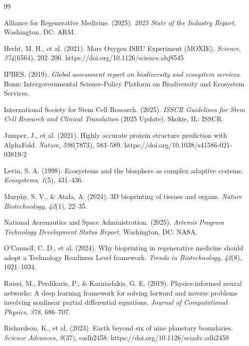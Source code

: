 \documentclass[11pt,a4paper]{article}
\begin{document}
\begin{thebibliography}{99}

Alliance for Regenerative Medicine. (2025). \textit{2025 State of the Industry Report}. Washington, DC: ARM.

Hecht, M. H., et al. (2021). Mars Oxygen ISRU Experiment (MOXIE). \textit{Science}, \textit{374}(6564), 202--206. https://doi.org/10.1126/science.abj8545

IPBES. (2019). \textit{Global assessment report on biodiversity and ecosystem services}. Bonn: Intergovernmental Science-Policy Platform on Biodiversity and Ecosystem Services.

International Society for Stem Cell Research. (2025). \textit{ISSCR Guidelines for Stem Cell Research and Clinical Translation} (2025 Update). Skokie, IL: ISSCR.

Jumper, J., et al. (2021). Highly accurate protein structure prediction with AlphaFold. \textit{Nature}, \textit{596}(7873), 583--589. https://doi.org/10.1038/s41586-021-03819-2

Levin, S. A. (1998). Ecosystems and the biosphere as complex adaptive systems. \textit{Ecosystems}, \textit{1}(5), 431--436.

Murphy, S. V., \& Atala, A. (2024). 3D bioprinting of tissues and organs. \textit{Nature Biotechnology}, \textit{42}(1), 22--35.

National Aeronautics and Space Administration. (2025). \textit{Artemis Program Technology Development Status Report}. Washington, DC: NASA.

O'Connell, C. D., et al. (2024). Why bioprinting in regenerative medicine should adopt a Technology Readiness Level framework. \textit{Trends in Biotechnology}, \textit{42}(8), 1021--1034.

Raissi, M., Perdikaris, P., \& Karniadakis, G. E. (2019). Physics-informed neural networks: A deep learning framework for solving forward and inverse problems involving nonlinear partial differential equations. \textit{Journal of Computational Physics}, \textit{378}, 686--707.

Richardson, K., et al. (2023). Earth beyond six of nine planetary boundaries. \textit{Science Advances}, \textit{9}(37), eadh2458. https://doi.org/10.1126/sciadv.adh2458


\end{thebibliography}
\end{document}
